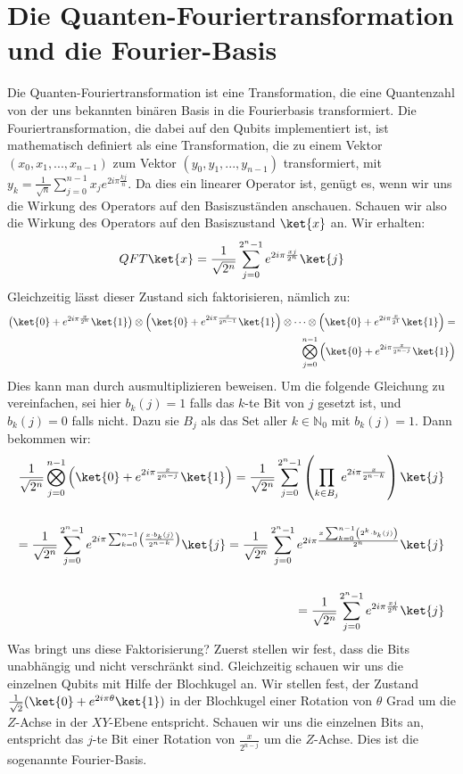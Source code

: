 \section{Die Quanten-Fouriertransformation und die Fourier-Basis}
Die Quanten-Fouriertransformation ist eine Transformation, die eine Quantenzahl von der uns bekannten binären Basis in die Fourierbasis transformiert. Die Fouriertransformation, die dabei auf den Qubits implementiert ist, ist mathematisch definiert als eine Transformation, die zu einem Vektor $(x_0, x_1, ..., x_{n - 1})$ zum Vektor $(y_0, y_1, ..., y_{n - 1})$ transformiert, mit $y_k = \frac{1}{\sqrt{n}}\sum_{j = 0}^{n - 1}x_je^{2i\pi\frac{kj}{n}}$. Da dies ein linearer Operator ist, genügt es, wenn wir uns die Wirkung des Operators auf den Basiszuständen anschauen. Schauen wir also die Wirkung des Operators auf den Basiszustand $\ket{x}$ an. Wir erhalten:
$$QFT\ket{x} = \frac{1}{\sqrt{2^n}}\sum^{2^n - 1}_{j = 0}e^{2i\pi\frac{xj}{2^n}}\ket{j}$$
Gleichzeitig lässt dieser Zustand sich faktorisieren, nämlich zu:
\begin{align*}
\left(\ket{0} + e^{2i\pi\frac{x}{2^{n}}}\ket{1}\right)\otimes\left(\ket{0} + e^{2i\pi\frac{x}{2^{n - 1}}}\ket{1}\right)\otimes\cdots\otimes\left(\ket{0} + e^{2i\pi\frac{x}{2^{1}}}\ket{1}\right) = \\ \bigotimes_{j = 0}^{n - 1}\left(\ket{0} + e^{2i\pi\frac{x}{2^{n - j}}}\ket{1}\right)
\end{align*}
Dies kann man durch ausmultiplizieren beweisen. Um die folgende Gleichung zu vereinfachen, sei hier $b_k(j) = 1$ falls das $k$-te Bit von $j$ gesetzt ist, und $b_k(j) = 0$ falls nicht. Dazu sie $B_j$ als das Set aller $k \in \mathbb{N}_0$ mit $b_k(j) = 1$. Dann bekommen wir:
\begin{align*}
\frac{1}{\sqrt{2^n}}\bigotimes_{j = 0}^{n - 1}\left(\ket{0} + e^{2i\pi\frac{x}{2^{n - j}}}\ket{1}\right) = \frac{1}{\sqrt{2^n}}\sum_{j = 0}^{2^n - 1}\left(\prod_{k \in B_j}e^{2i\pi\frac{x}{2^{n - k}}}\right)\ket{j} \\ \\
= \frac{1}{\sqrt{2^n}}\sum_{j = 0}^{2^n - 1}e^{2i\pi\sum_{k = 0}^{n - 1}\left(\frac{x \cdot b_k(j)}{2^{n - k}}\right)}\ket{j} = \frac{1}{\sqrt{2^n}}\sum_{j = 0}^{2^n - 1}e^{2i\pi\frac{x\sum_{k = 0}^{n - 1}\left(2^k\cdot b_k(j)\right)}{2^n}}\ket{j} \\ \\
= \frac{1}{\sqrt{2^n}}\sum_{j = 0}^{2^n - 1}e^{2i\pi\frac{xj}{2^n}}\ket{j}
\end{align*}
Was bringt uns diese Faktorisierung? Zuerst stellen wir fest, dass die Bits unabhängig und nicht verschränkt sind. Gleichzeitig schauen wir uns die einzelnen Qubits mit Hilfe der Blochkugel an. Wir stellen fest, der Zustand $\frac{1}{\sqrt{2}}(\ket{0} + e^{2i\pi\theta}\ket{1})$ in der Blochkugel einer Rotation von $\theta$ Grad um die $Z$-Achse in der $XY$-Ebene entspricht. Schauen wir uns die einzelnen Bits an, entspricht das $j$-te Bit einer Rotation von $\frac{x}{2^{n - j}}$ um die $Z$-Achse. Dies ist die sogenannte Fourier-Basis.

